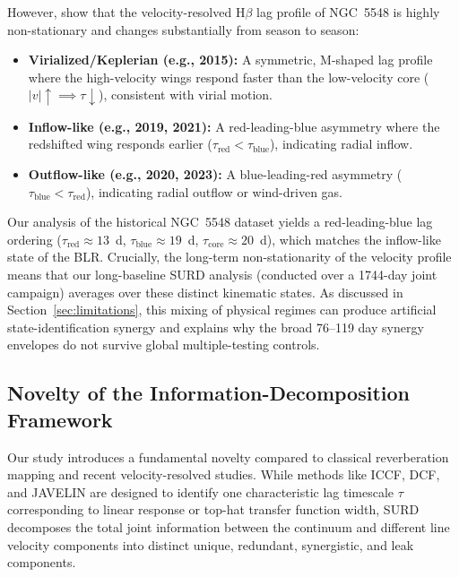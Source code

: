 \documentclass[12pt, a4paper]{article}
\begin{document}
However, \textcite{LongDexter2025} show that the velocity-resolved H\(\beta\) lag profile of NGC~5548 is highly non-stationary and changes substantially from season to season:
\begin{itemize}
    \item \textbf{Virialized/Keplerian (e.g., 2015):} A symmetric, M-shaped lag profile where the high-velocity wings respond faster than the low-velocity core ($|v| \uparrow \implies \tau \downarrow$), consistent with virial motion.
    \item \textbf{Inflow-like (e.g., 2019, 2021):} A red-leading-blue asymmetry where the redshifted wing responds earlier ($\tau_{\mathrm{red}} < \tau_{\mathrm{blue}}$), indicating radial inflow.
    \item \textbf{Outflow-like (e.g., 2020, 2023):} A blue-leading-red asymmetry ($\tau_{\mathrm{blue}} < \tau_{\mathrm{red}}$), indicating radial outflow or wind-driven gas.
\end{itemize}
Our analysis of the historical NGC~5548 dataset yields a red-leading-blue lag ordering (\(\tau_{\mathrm{red}} \approx 13\)~d, \(\tau_{\mathrm{blue}} \approx 19\)~d, \(\tau_{\mathrm{core}} \approx 20\)~d), which matches the inflow-like state of the BLR. Crucially, the long-term non-stationarity of the velocity profile means that our long-baseline SURD analysis (conducted over a 1744-day joint campaign) averages over these distinct kinematic states. As discussed in Section~\ref{sec:limitations}, this mixing of physical regimes can produce artificial state-identification synergy and explains why the broad 76--119 day synergy envelopes do not survive global multiple-testing controls.

\subsection{Novelty of the Information-Decomposition Framework}
\label{sec:novelty_framework}

Our study introduces a fundamental novelty compared to classical reverberation mapping and recent velocity-resolved studies. While methods like ICCF, DCF, and JAVELIN are designed to identify one characteristic lag timescale $\tau$ corresponding to linear response or top-hat transfer function width, SURD decomposes the total joint information between the continuum and different line velocity components into distinct unique, redundant, synergistic, and leak components.
\end{document}
